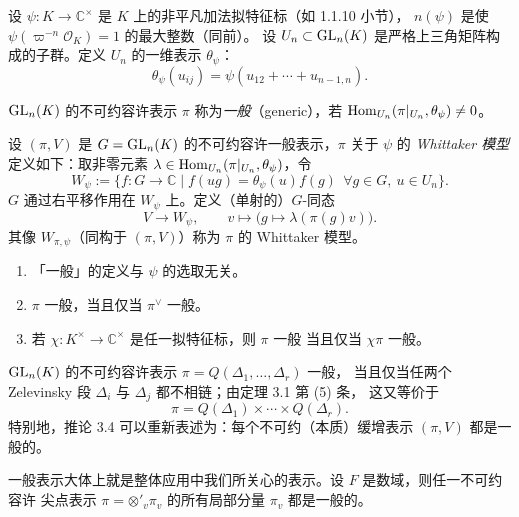 设 $\psi\colon K\to\mathbb{C}^{\times}$ 是 $K$ 上的非平凡加法拟特征标（如 1.1.10 小节），
$n(\psi)$ 是使 $\psi(\varpi^{-n}\mathcal{O}_K)=1$ 的最大整数（同前）。
设 $U_n\subset\mathrm{GL}_n(K)$ 是严格上三角矩阵构成的子群。定义 $U_n$ 的一维表示 $\theta_{\psi}$：
\[
\theta_{\psi}(u_{ij})=\psi(u_{12}+\cdots+u_{n-1,n}).
\]

\begin{definition}
$\mathrm{GL}_n(K)$ 的不可约容许表示 $\pi$ 称为\emph{一般}（generic），若
$\mathrm{Hom}_{U_n}(\pi|_{U_n},\theta_{\psi})\neq 0$。
\end{definition}

\begin{definition}
设 $(\pi,V)$ 是 $G=\mathrm{GL}_n(K)$ 的不可约容许一般表示，$\pi$ 关于 $\psi$ 的
\emph{Whittaker 模型}定义如下：取非零元素
$\lambda\in\mathrm{Hom}_{U_n}(\pi|_{U_n},\theta_{\psi})$，令
\[
W_{\psi}:=\{f\colon G\to\mathbb{C}\mid f(ug)=\theta_{\psi}(u)f(g)\ 
\ \forall g\in G,\ u\in U_n\}.
\]
$G$ 通过右平移作用在 $W_{\psi}$ 上。定义（单射的）$G$-同态
\[
V\longrightarrow W_{\psi},\qquad v\longmapsto\bigl(g\mapsto\lambda(\pi(g)v)\bigr).
\]
其像 $W_{\pi,\psi}$（同构于 $(\pi,V)$）称为 $\pi$ 的 Whittaker 模型。
\end{definition}

\begin{lemma}
\leavevmode
\begin{enumerate}[label=(\arabic*),leftmargin=2.2em]
\item 「一般」的定义与 $\psi$ 的选取无关。
\item $\pi$ 一般，当且仅当 $\pi^{\vee}$ 一般。
\item 若 $\chi\colon K^{\times}\to\mathbb{C}^{\times}$ 是任一拟特征标，则 $\pi$ 一般
      当且仅当 $\chi\pi$ 一般。
\end{enumerate}
\end{lemma}

\begin{theorem}[Zelevinsky]
$\mathrm{GL}_n(K)$ 的不可约容许表示 $\pi=Q(\Delta_1,\dots,\Delta_r)$ 一般，
当且仅当任两个 Zelevinsky 段 $\Delta_i$ 与 $\Delta_j$ 都不相链；由定理 3.1 第 (5) 条，
这又等价于
\[
\pi=Q(\Delta_1)\times\cdots\times Q(\Delta_r).
\]
特别地，推论 3.4 可以重新表述为：每个不可约（本质）缓增表示 $(\pi,V)$ 都是一般的。
\end{theorem}

\begin{remark}[Shalika]
一般表示大体上就是整体应用中我们所关心的表示。设 $F$ 是数域，则任一不可约容许
尖点表示 $\pi=\otimes'_v\pi_v$ 的所有局部分量 $\pi_v$ 都是一般的。
\end{remark}

